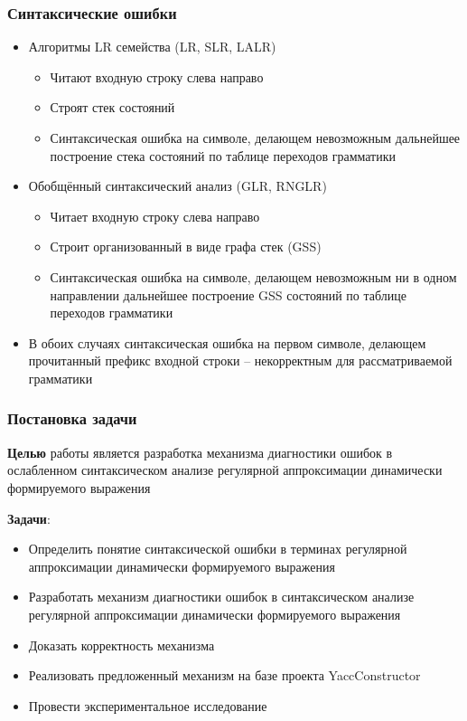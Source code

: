 \documentclass{beamer}
\begin{document}
\begin{frame}[fragile]
	\transwipe[direction=90]
	\frametitle{Синтаксические ошибки}
	\begin{itemize}
	    \item Алгоритмы LR семейства (LR, SLR, LALR)
    	\begin{itemize}
    		\item Читают входную строку слева направо
    		\item Строят стек состояний
        	\item Синтаксическая ошибка на символе, делающем невозможным дальнейшее построение стека состояний по таблице переходов грамматики
        \end{itemize}
        \item Обобщённый синтаксический анализ (GLR, RNGLR)
    	\begin{itemize}
    		\item Читает входную строку слева направо
    		\item Строит организованный в виде графа стек (GSS)
        	\item Синтаксическая ошибка на символе, делающем невозможным ни в одном направлении дальнейшее построение GSS состояний по таблице переходов грамматики
        \end{itemize}
    \end{itemize}
    \begin{itemize}
	    \item В обоих случаях синтаксическая ошибка на первом символе, делающем прочитанный префикс входной строки -- некорректным для рассматриваемой грамматики
    \end{itemize}
\end{frame}

\begin{frame}
  \transwipe[direction=90]
  \frametitle{Постановка задачи}
  \textbf{Целью} работы является разработка механизма диагностики ошибок в ослабленном синтаксическом анализе регулярной аппроксимации динамически формируемого выражения 

  \textbf{Задачи}:
  \begin{itemize}
    \item Определить понятие синтаксической ошибки в терминах регулярной аппроксимации динамически формируемого выражения
    \item Разработать механизм диагностики ошибок в синтаксическом анализе регулярной аппроксимации динамически формируемого выражения
    \item Доказать корректность механизма
    \item Реализовать предложенный механизм на базе проекта YaccConstructor
    \item Провести экспериментальное исследование
  \end{itemize}
\end{frame}
\end{document}
